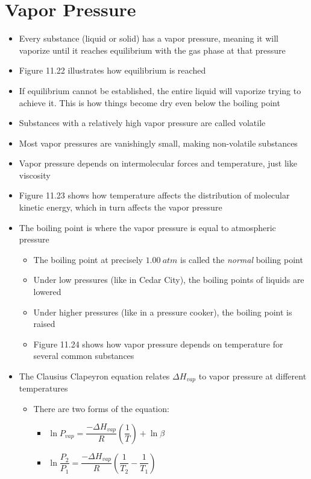 \documentclass[12pt, openany, letterpaper]{memoir}
\begin{document}
\section{Vapor Pressure}
\begin{itemize}
	\item Every substance (liquid or solid) has a vapor pressure, meaning it will vaporize until it reaches equilibrium with the gas phase at that pressure
  \item Figure 11.22 illustrates how equilibrium is reached
	\item If equilibrium cannot be established, the entire liquid will vaporize trying to achieve it. This is how things become dry even below the boiling point
	\item Substances with a relatively high vapor pressure are called volatile	
	\item Most vapor pressures are vanishingly small, making non-volatile substances
	\item Vapor pressure depends on intermolecular forces and temperature, just like viscosity
	\item Figure 11.23 shows how temperature affects the distribution of molecular kinetic energy, which in turn affects the vapor pressure
	\item The boiling point is where the vapor pressure is equal to atmospheric pressure
	\begin{itemize}
		\item The boiling point at precisely $1.00~atm$ is called the \emph{normal} boiling point
		\item Under low pressures (like in Cedar City), the boiling points of liquids are lowered
		\item Under higher pressures (like in a pressure cooker), the boiling point is raised
    \item Figure 11.24 shows how vapor pressure depends on temperature for several common substances
	\end{itemize}
	\item The Clausius Clapeyron equation relates $\Delta H_{vap}$ to vapor pressure at different temperatures
	\begin{itemize}
		\item There are two forms of the equation:
		\begin{itemize}
			\item $\ln P_{vap} = \dfrac{-\Delta H_{vap}}{R}\left(\dfrac{1}{T}\right) + \ln\beta$
			\item $\ln\dfrac{P_2}{P_1}=\dfrac{-\Delta H_{vap}}{R}\left(\dfrac{1}{T_2} - \dfrac{1}{T_1}\right)$

\end{itemize}
\end{itemize}
\end{itemize}
\end{document}
